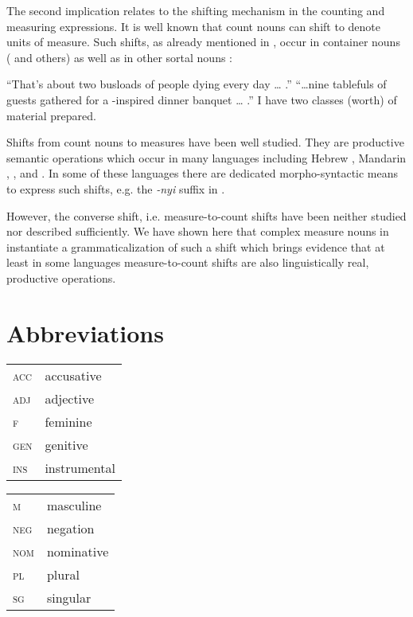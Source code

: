 \documentclass[output=paper]{langscibook}
\begin{document}
\noindent The second implication relates to the shifting mechanism in the counting and measuring expressions. It is well known that count nouns can shift to denote units of measure. Such shifts, as already mentioned in , occur in container nouns (\citealt{Doetjes1997,Landman2004,Rothstein2009} and others) as well as in other sortal nouns  \citep{Rothstein2017}:

    \largerpage %

\ea\label{ex:khrizmann:44}
    \ea ``That's about two busloads of people dying every day {\dots} .''
    \ex ``\dots nine tablefuls of guests gathered for a -inspired dinner banquet {\dots} .''
    \ex I have two classes (worth) of material prepared. \hfill \citep[216f.]{Rothstein2017}
\z\z

\noindent Shifts from count nouns to measures have been well studied. They are productive semantic operations which occur in many languages including Hebrew \citep{Rothstein2009}, Mandarin \citep{Li2013},  \citep{Schvarcz2014}, and  \citep{Partee.Borschev2012,Khrizman2016,Khrizman2016b}. In some of these languages there are dedicated morpho-syntactic means to express such shifts, e.g. the \textit{-nyi} suffix in  \citep{Schvarcz2014,Schvarcz2017}.

However, the converse shift, i.e. measure-to-count shifts have been neither studied nor described sufficiently. We have shown here that complex measure nouns in  instantiate a grammaticalization of such a shift which brings evidence that at least in some languages measure-to-count shifts are also linguistically real, productive operations.


\section*{Abbreviations}

\begin{tabularx}{.5\textwidth}{@{}lX@{}}
\textsc{acc}& accusative\\
\textsc{adj}& adjective \\
\textsc{f}& feminine \\
\textsc{gen}& genitive \\
\textsc{ins}& instrumental \\
\end{tabularx}%
\begin{tabularx}{.5\textwidth}{@{}lX@{}}
\textsc{m}& masculine \\
\textsc{neg}& negation \\
\textsc{nom}& nominative \\
\textsc{pl}& plural \\
\textsc{sg}& singular \\
\end{tabularx}
\end{document}
